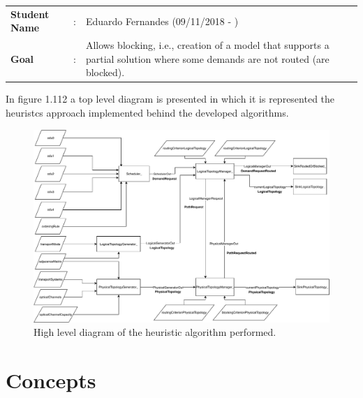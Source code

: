 \begin{tcolorbox}	
	\begin{tabular}{p{2.75cm} p{0.2cm} p{10.5cm}} 	
		\textbf{Student Name}   &:& Eduardo Fernandes    (09/11/2018 - )\\
		\textbf{Goal}           &:& Allows blocking, i.e., creation of a model that supports a partial solution where some demands are not routed (are blocked).
	\end{tabular}
\end{tcolorbox}

 \vspace{11pt}
 In figure 1.112 a top level diagram is presented in which it is represented the heuristcs approach implemented behind the developed algorithms. %

\begin{figure}[H]
	\centering
	\includegraphics[width=15cm]{sdf/heuristic/transparent/figures/novoFluxograma}
	\caption{High level diagram of the heuristic algorithm performed.}
	\label{fluxogram_transparent_surv}
\end{figure}

\section{Concepts}

